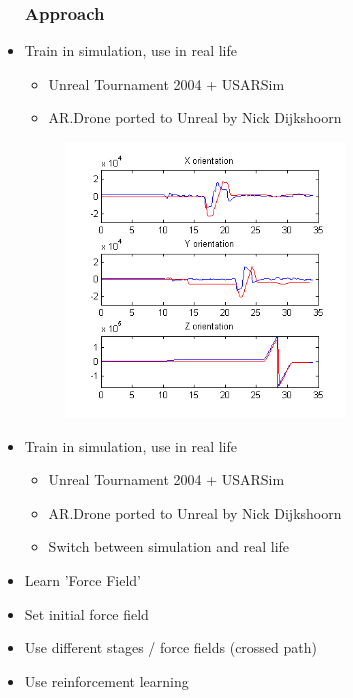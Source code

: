 \documentclass[10pt]{beamer}
\begin{document}
\begin{frame}
 \begin{itemize}
   \frametitle{Approach}
   \item Train in simulation, use in real life
   \begin{itemize}
     \item Unreal Tournament 2004 + USARSim
     \item AR.Drone ported to Unreal by Nick Dijkshoorn
   \end{itemize}
 \begin{figure}
  \includegraphics[width=0.7\textwidth]{img/ardrone_real_sim}
 \end{figure}
 \end{itemize}
\end{frame}

\begin{frame}
 \begin{itemize}
   \item Train in simulation, use in real life
   \begin{itemize}
     \item Unreal Tournament 2004 + USARSim
     \item AR.Drone ported to Unreal by Nick Dijkshoorn
     \item Switch between simulation and real life
   \end{itemize}
   \item Learn 'Force Field'
   \pause
   \item Set initial force field
   \pause
   \item Use different stages / force fields (crossed path)
   \pause
   \item Use reinforcement learning
 \end{itemize}
\end{frame}
\end{document}
